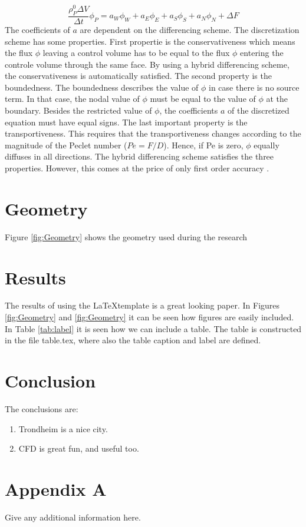 \documentclass{CFD2017}
\begin{document}
\begin{equation}
\label{Substituted}
\frac{\rho_P^0 \Delta V}{\Delta t}\phi_P=a_W\phi_W+a_E\phi_E+a_S\phi_S+a_N\phi_N +\Delta F
\end{equation}
The coefficients of $a$ are dependent on the differencing scheme. The discretization scheme has some properties. First propertie is the conservativeness which means the flux $\phi$ leaving a control volume has to be equal to the flux $\phi$ entering the controle volume through the same face. By using a hybrid differencing scheme, the conservativeness is automatically satisfied. The second property is the boundedness. The boundedness describes the value of $\phi$ in case there is no source term. In that case, the nodal value of $\phi$ must be equal to the value of $\phi$ at the boundary. Besides the restricted value of $\phi$, the coefficients $a$ of the discretized equation must have equal signs. The last important property is the transportiveness. This requires that the transportiveness changes according to the magnitude of the Peclet number ($Pe=F/D$). Hence, if Pe is zero, $\phi$ equally diffuses in all directions. The hybrid differencing scheme satisfies the three properties. However, this comes at the price of only first order accuracy \cite{Versteeg2007}.

\section{Geometry}

Figure \ref{fig:Geometry} shows the geometry used during the research


\section{Results}
The results of using the \LaTeX template is a great looking paper.
In Figures \ref{fig:Geometry} and \ref{fig:Geometry} it can be seen how figures are easily included.
In Table \ref{tab:label} it is seen how we can include a table.
The table is constructed in the file table.tex, where also the table caption and label are defined.


\newpage
{}

\section{Conclusion}
The conclusions are:
\begin{enumerate}
  \item Trondheim is a nice city.
  \item CFD is great fun, and useful too.
\end{enumerate}






\newpage
\section{Appendix A}
Give any additional information here.
\end{document}
